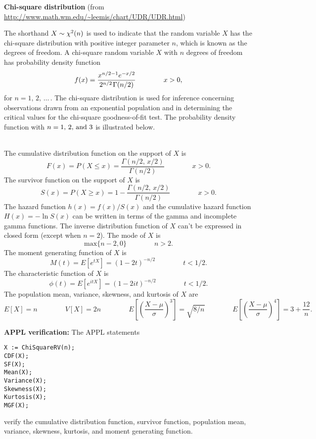 \documentclass[12pt,fullpage]{article}
\begin{document}
\noindent
{\bf Chi-square distribution} (from \color{blue}\url{http://www.math.wm.edu/~leemis/chart/UDR/UDR.html}\color{black})

\noindent
The shorthand $X \sim {\rm \chi^{2}}(n)$ is used to indicate that the
random variable $X$ has the chi-square distribution with positive integer parameter $n$, which is known
as the degrees of freedom.
A chi-square random variable $X$ with $n$ degrees of freedom has probability density function 
$$
f(x) = \frac{x^{n/2-1}e^{-x/2}}{2^{n/2}\kern 0.08 em \Gamma(n/2)} \qquad \qquad x > 0,
$$
for $n = 1, \, 2, \,  \ldots \,$. 
The chi-square distribution is used for inference concerning observations drawn from an
exponential population and in determining the critical values for the chi-square goodness-of-fit test.
The probability density function with $n=1,\, 2,\, {\rm and} \ 3$ is illustrated below.
\begin{figure}[h!]
\begin{center}
\end{center}
\end{figure}\\
The cumulative distribution function on
the support of $X$ is
$$
F(x) = P(X \le x) = \frac{\Gamma(n/2, \, x/2)}{\Gamma(n/2)} \qquad \qquad x > 0.
$$
The survivor function on the support of $X$ is
$$
S(x) = P(X \ge x) = 1-\frac{\Gamma(n/2, \, x/2)}{\Gamma(n/2)} \qquad \qquad x > 0.
$$
The hazard function $h(x) = f(x) / S(x)$ and the cumulative hazard function 
$H(x) = - \ln S(x)$ can be written in terms of the gamma and incomplete
gamma functions.
The inverse distribution function of $X$ can't be expressed in closed form (except
when $n = 2$).
The mode of $X$ is
$$
\textrm{max}\{n-2,0\} \qquad \qquad n>2.
$$
The moment generating function of $X$ is
$$
M(t) = E\left[ e ^ {tX} \right] = (1-2t)^{-n/2} \qquad \qquad t < 1/2.
$$
The characteristic function of $X$ is
$$
\phi(t) = E\left[ e ^ {itX} \right] =  (1-2it)^{-n/2} \qquad \qquad t < 1/2.
$$
The population mean, variance, skewness, and kurtosis of $X$ are
$$
E[X] = n \qquad \qquad 
V[X] = 2n \qquad \qquad 
E\left[ \left( \frac{X - \mu}{\sigma} \right) ^ 3 \right] = \sqrt{8/n} \qquad \qquad 
E\left[ \left( \frac{X - \mu}{\sigma} \right) ^ 4 \right] = 3 + \frac{12}{n}.
$$

\vspace{0.1in}

\noindent
{\bf APPL verification:}
The APPL statements
\begin{verbatim}
X := ChiSquareRV(n);
CDF(X);
SF(X);
Mean(X);
Variance(X);
Skewness(X);
Kurtosis(X);
MGF(X);
\end{verbatim}
verify the cumulative distribution function, survivor function,  population mean, variance, skewness, kurtosis, and moment generating function.
\end{document}

